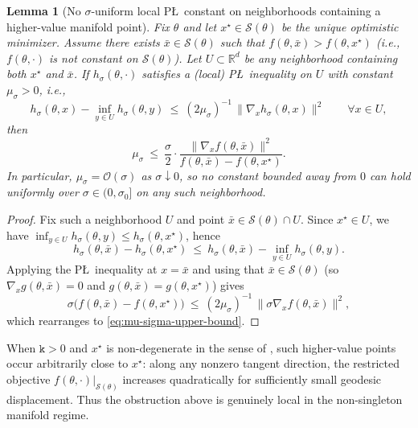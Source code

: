 \documentclass{article}
\theoremstyle{normaltheorem}
\newtheorem{lemma}[lemma]{Lemma}
\newcommand{\dimk}{\texttt{k}}
\newcommand{\R}{\mathbb{R}}
\newcommand{\calS}{\mathcal{S}}
\begin{document}
\begin{lemma}[No \(\sigma\)-uniform local P\L\ constant on neighborhoods containing a higher-value manifold point]\label{lem:no-sigma-uniform-pl}
Fix \(\theta\) and let \(x^\star\in\calS(\theta)\) be the unique optimistic minimizer.
Assume there exists \(\bar x\in\calS(\theta)\) such that \(f(\theta,\bar x)>f(\theta,x^\star)\) (i.e., \(f(\theta,\cdot)\) is not constant on \(\calS(\theta)\)).
Let \(U\subset\R^d\) be any neighborhood containing both \(x^\star\) and \(\bar x\).
If \(h_\sigma(\theta,\cdot)\) satisfies a (local) P\L\ inequality on \(U\) with constant \(\mu_\sigma>0\), i.e.,
\[
h_\sigma(\theta,x)-\inf_{y\in U} h_\sigma(\theta,y)\ \le\ (2\mu_\sigma)^{-1}\,\|\nabla_x h_\sigma(\theta,x)\|^2
\qquad\forall x\in U,
\]
then
\begin{equation}\label{eq:mu-sigma-upper-bound}
\mu_\sigma
\ \le\
\frac{\sigma}{2}\cdot
\frac{\|\nabla_x f(\theta,\bar x)\|^2}{f(\theta,\bar x)-f(\theta,x^\star)}.
\end{equation}
In particular, \(\mu_\sigma=\mathcal{O}(\sigma)\) as \(\sigma\downarrow 0\), so no constant bounded away from \(0\) can hold
uniformly over \(\sigma\in(0,\sigma_0]\) on any such neighborhood.
\end{lemma}

\begin{proof}
Fix such a neighborhood \(U\) and point \(\bar x\in\calS(\theta)\cap U\).
Since \(x^\star\in U\), we have \(\inf_{y\in U}h_\sigma(\theta,y)\le h_\sigma(\theta,x^\star)\), hence
\[
h_\sigma(\theta,\bar x)-h_\sigma(\theta,x^\star)
\ \le\
h_\sigma(\theta,\bar x)-\inf_{y\in U}h_\sigma(\theta,y).
\]
Applying the P\L\ inequality at \(x=\bar x\) and using that \(\bar x\in\calS(\theta)\) (so \(\nabla_x g(\theta,\bar x)=0\) and \(g(\theta,\bar x)=g(\theta,x^\star)\)) gives
\[
\sigma\big(f(\theta,\bar x)-f(\theta,x^\star)\big)
\ \le\
(2\mu_\sigma)^{-1}\,\|\sigma\nabla_x f(\theta,\bar x)\|^2,
\]
which rearranges to \eqref{eq:mu-sigma-upper-bound}.
\end{proof}

When \(\dimk>0\) and \(x^\star\) is non-degenerate in the sense of
, such higher-value points occur arbitrarily close to \(x^\star\): along any nonzero
tangent direction, the restricted objective \(f(\theta,\cdot)|_{\calS(\theta)}\) increases quadratically for sufficiently
small geodesic displacement. Thus the obstruction above is genuinely local in the non-singleton manifold regime.
\end{document}
